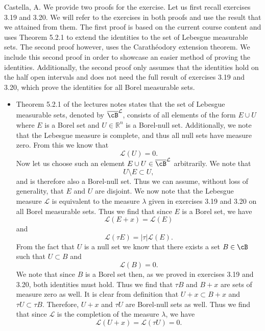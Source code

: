 \begin{solution}[4.10]{Castella, A.}
    We provide two proofs for the exercise. Let us first recall exercises 3.19 and 3.20. We will refer to the exercises in both proofs and use the result that we attained from them. The first proof is based on the current course content and uses Theorem 5.2.1 to extend the identities to the set of Lebesgue measurable sets. The second proof however, uses the Carath\'{e}odory extension theorem. We include this second proof in order to showcase an easier method of proving the identities. Additionally, the second proof only assumes that the identities hold on the half open intervals and does not need the full result of exercises 3.19 and 3.20, which prove the identities for all Borel measurable sets.
    \begin{itemize}
        \item Theorem 5.2.1 of the lectures notes states that the set of Lebesgue measurable sets, denoted by $\overline{\cB}^\mathcal{L}$, consists of all elements of the form $E\cup U$ where $E$ is a Borel set and $U \in \mathbb{R}^n$ is a Borel-null set. Additionally, we note that the Lebesgue measure is complete, and thus all null sets have measure zero. From this we know that
        $$
            \mathcal{L}(U) = 0.
        $$
        Now let us choose such an element $E\cup U \in \overline{\cB}^\mathcal{L}$ arbitrarily. We note that
        $$
            U \setminus E \subset U,
        $$
        and is therefore also a Borel-null set. Thus we can assume, without loss of generality, that $E$ and $U$ are disjoint. We now note that the Lebesgue measure $\mathcal{L}$ is equivalent to the measure $\lambda$ given in exercises 3.19 and 3.20 on all Borel measurable sets. Thus we find that since $E$ is a Borel set, we have
        $$
            \mathcal{L}(E + x) = \mathcal{L}(E)
        $$
        and
        $$
            \mathcal{L}(\tau E) = |\tau|\mathcal{L}(E).
        $$
        From the fact that $U$ is a null set we know that there exists a set $B \in \cB$ such that $U \subset B$ and
        $$
            \mathcal{L}(B) = 0.
        $$
        We note that since $B$ is a Borel set then, as we proved in exercises 3.19 and 3.20, both identities must hold. Thus we find that $\tau B$ and $B + x$ are sets of measure zero as well. It is clear from definition that $U + x \subset B + x$ and $\tau U \subset \tau B$. Therefore, $U + x$ and $\tau  U$ are Borel-null sets as well. Thus we find that since $\mathcal{L}$ is the completion of the measure $\lambda$, we have
        $$
            \mathcal{L}(U + x) = \mathcal{L}(\tau U) = 0.
$$
\end{itemize}
\end{solution}
